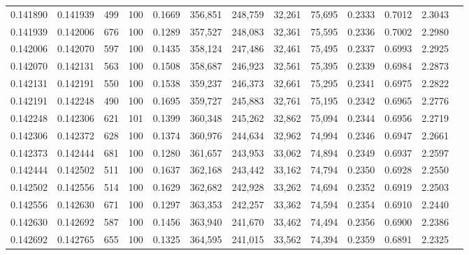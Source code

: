 \begin{tabular}{rrrrrrrrrrrrr}
0.141890 & 0.141939 &   499 & 100 &                                     0.1669 & 356,851 & 248,759 &  32,261 &  75,695 & 0.2333 & 0.7012 & 2.3043 \\
0.141939 & 0.142006 &   676 & 100 &                                     0.1289 & 357,527 & 248,083 &  32,361 &  75,595 & 0.2336 & 0.7002 & 2.2980 \\
0.142006 & 0.142070 &   597 & 100 &                                     0.1435 & 358,124 & 247,486 &  32,461 &  75,495 & 0.2337 & 0.6993 & 2.2925 \\
0.142070 & 0.142131 &   563 & 100 &                                     0.1508 & 358,687 & 246,923 &  32,561 &  75,395 & 0.2339 & 0.6984 & 2.2873 \\
0.142131 & 0.142191 &   550 & 100 &                                     0.1538 & 359,237 & 246,373 &  32,661 &  75,295 & 0.2341 & 0.6975 & 2.2822 \\
0.142191 & 0.142248 &   490 & 100 &                                     0.1695 & 359,727 & 245,883 &  32,761 &  75,195 & 0.2342 & 0.6965 & 2.2776 \\
0.142248 & 0.142306 &   621 & 101 &                                     0.1399 & 360,348 & 245,262 &  32,862 &  75,094 & 0.2344 & 0.6956 & 2.2719 \\
0.142306 & 0.142372 &   628 & 100 &                                     0.1374 & 360,976 & 244,634 &  32,962 &  74,994 & 0.2346 & 0.6947 & 2.2661 \\
0.142373 & 0.142444 &   681 & 100 &                                     0.1280 & 361,657 & 243,953 &  33,062 &  74,894 & 0.2349 & 0.6937 & 2.2597 \\
0.142444 & 0.142502 &   511 & 100 &                                     0.1637 & 362,168 & 243,442 &  33,162 &  74,794 & 0.2350 & 0.6928 & 2.2550 \\
0.142502 & 0.142556 &   514 & 100 &                                     0.1629 & 362,682 & 242,928 &  33,262 &  74,694 & 0.2352 & 0.6919 & 2.2503 \\
0.142556 & 0.142630 &   671 & 100 &                                     0.1297 & 363,353 & 242,257 &  33,362 &  74,594 & 0.2354 & 0.6910 & 2.2440 \\
0.142630 & 0.142692 &   587 & 100 &                                     0.1456 & 363,940 & 241,670 &  33,462 &  74,494 & 0.2356 & 0.6900 & 2.2386 \\
0.142692 & 0.142765 &   655 & 100 &                                     0.1325 & 364,595 & 241,015 &  33,562 &  74,394 & 0.2359 & 0.6891 & 2.2325 \\

\end{tabular}
